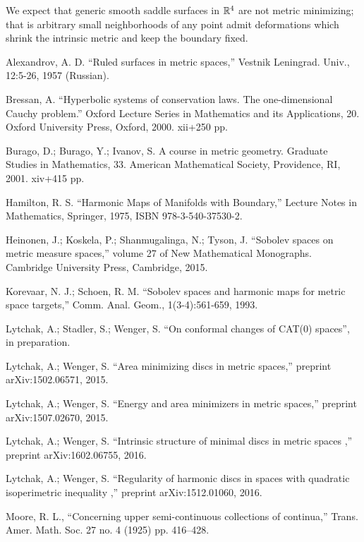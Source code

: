 \documentclass[a4paper,10pt]{amsart}
\begin{document}
We expect that generic smooth saddle surfaces in $\mathbb{R}^4$ are not metric minimizing; that is arbitrary small neighborhoods of any point admit deformations which shrink 
the intrinsic metric and keep the boundary fixed.




\begin{thebibliography}{52}

 Alexandrov, A. D. ``Ruled  surfaces  in  metric  spaces,'' Vestnik Leningrad. Univ., 12:5-26, 1957 (Russian).

 Bressan, A.
``Hyperbolic systems of conservation laws.
The one-dimensional Cauchy problem.'' 
Oxford Lecture Series in Mathematics and its Applications, 20. 
Oxford University Press, Oxford, 2000. 
xii+250 pp.

Burago, D.; Burago, Y.; Ivanov, S.
A course in metric geometry.
Graduate Studies in Mathematics, 33. American Mathematical Society, Providence, RI, 2001. xiv+415 pp.

 Hamilton, R. S. ``Harmonic Maps of Manifolds with Boundary,'' Lecture Notes in Mathematics, Springer, 1975, ISBN 978-3-540-37530-2.

 Heinonen, J.;  Koskela, P.;  Shanmugalinga, N.; Tyson, J. ``Sobolev spaces on metric measure spaces,''
volume 27 of New Mathematical Monographs. Cambridge University Press, Cambridge, 2015.

Korevaar, N. J.; Schoen, R. M. ``Sobolev spaces and harmonic maps for metric space targets,'' Comm. Anal. Geom., 1(3-4):561-659, 1993.

 Lytchak, A.; Stadler, S.; Wenger, S.  ``On conformal changes of CAT(0) spaces'', in preparation.

Lytchak, A.; Wenger, S. ``Area minimizing discs in metric spaces,'' preprint arXiv:1502.06571, 2015.

Lytchak, A.; Wenger, S. ``Energy and area minimizers in metric spaces,'' preprint  arXiv:1507.02670, 2015.

Lytchak, A.; Wenger, S. ``Intrinsic structure of minimal discs in metric spaces ,'' preprint  arXiv:1602.06755, 2016.

Lytchak, A.; Wenger, S. ``Regularity of harmonic discs in spaces with quadratic isoperimetric inequality  ,'' preprint  arXiv:1512.01060, 2016.

Moore, R. L.,
``Concerning upper semi-continuous collections of continua,''
Trans. Amer. Math. Soc. 27 no. 4 (1925) pp. 416--428.


\end{thebibliography}
\end{document}
